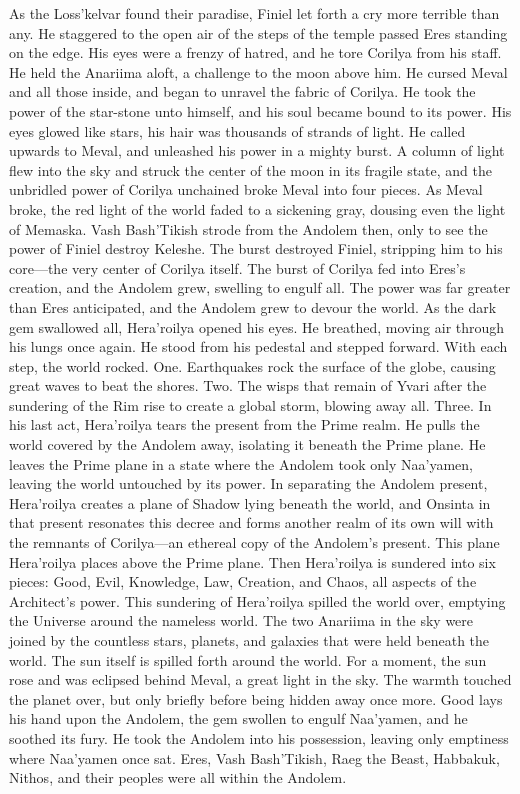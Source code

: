 \documentclass[smalldemyvopaper,11pt,twoside,onecolumn,openright,extrafontsizes]{memoir}
\begin{document}
As the Loss’kelvar found their paradise, Finiel let forth a cry more terrible than any. He staggered to the open air of the steps of the temple passed Eres standing on the edge. His eyes were a frenzy of hatred, and he tore Corilya from his staff. He held the Anariima aloft, a challenge to the moon above him. He cursed Meval and all those inside, and began to unravel the fabric of Corilya. He took the power of the star-stone unto himself, and his soul became bound to its power. His eyes glowed like stars, his hair was thousands of strands of light. He called upwards to Meval, and unleashed his power in a mighty burst. A column of light flew into the sky and struck the center of the moon in its fragile state, and the unbridled power of Corilya unchained broke Meval into four pieces. As Meval broke, the red light of the world faded to a sickening gray, dousing even the light of Memaska. Vash Bash’Tikish strode from the Andolem then, only to see the power of Finiel destroy Keleshe. The burst destroyed Finiel, stripping him to his core—the very center of Corilya itself. The burst of Corilya fed into Eres’s creation, and the Andolem grew, swelling to engulf all. The power was far greater than Eres anticipated, and the Andolem grew to devour the world.
As the dark gem swallowed all, Hera’roilya opened his eyes. He breathed, moving air through his lungs once again. He stood from his pedestal and stepped forward. With each step, the world rocked. One. Earthquakes rock the surface of the globe, causing great waves to beat the shores. Two. The wisps that remain of Yvari after the sundering of the Rim rise to create a global storm, blowing away all. Three. In his last act, Hera’roilya tears the present from the Prime realm. He pulls the world covered by the Andolem away, isolating it beneath the Prime plane. He leaves the Prime plane in a state where the Andolem took only Naa’yamen, leaving the world untouched by its power. In separating the Andolem present, Hera’roilya creates a plane of Shadow lying beneath the world, and Onsinta in that present resonates this decree and forms another realm of its own will with the remnants of Corilya—an ethereal copy of the Andolem’s present. This plane Hera’roilya places above the Prime plane. Then Hera’roilya is sundered into six pieces: Good, Evil, Knowledge, Law, Creation, and Chaos, all aspects of the Architect’s power.
 This sundering of Hera’roilya spilled the world over, emptying the Universe around the nameless world. The two Anariima in the sky were joined by the countless stars, planets, and galaxies that were held beneath the world. The sun itself is spilled forth around the world. For a moment, the sun rose and was eclipsed behind Meval, a great light in the sky. The warmth touched the planet over, but only briefly before being hidden away once more. Good lays his hand upon the Andolem, the gem swollen to engulf Naa’yamen, and he soothed its fury. He took the Andolem into his possession, leaving only emptiness where Naa’yamen once sat. Eres, Vash Bash’Tikish, Raeg the Beast, Habbakuk, Nithos, and their peoples were all within the Andolem.
\end{document}
